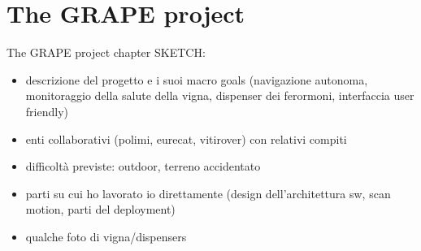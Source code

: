 
\chapter{The GRAPE project} \label{chap:grapeProject}

The GRAPE project chapter SKETCH:
\begin{itemize}
	\item descrizione del progetto e i suoi macro goals (navigazione autonoma, monitoraggio  della salute della vigna, dispenser dei ferormoni, interfaccia user friendly)
	\item enti collaborativi (polimi, eurecat, vitirover) con relativi compiti
	\item difficoltà previste: outdoor, terreno accidentato
	\item parti su cui ho lavorato io direttamente (design dell'architettura sw, scan motion, parti del deployment)
	\item qualche foto di vigna/dispensers
\end{itemize}

